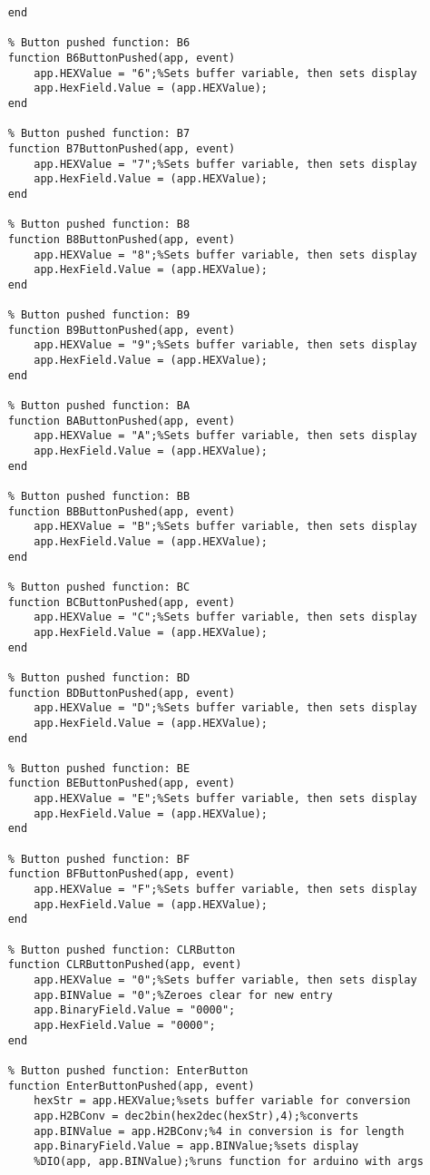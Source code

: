 \documentclass[11pt]{article}
\begin{document}
\begin{verbatim}
	end

	% Button pushed function: B6
	function B6ButtonPushed(app, event)
	    app.HEXValue = "6";%Sets buffer variable, then sets display
	    app.HexField.Value = (app.HEXValue);
	end

	% Button pushed function: B7
	function B7ButtonPushed(app, event)
	    app.HEXValue = "7";%Sets buffer variable, then sets display
	    app.HexField.Value = (app.HEXValue);
	end

	% Button pushed function: B8
	function B8ButtonPushed(app, event)
	    app.HEXValue = "8";%Sets buffer variable, then sets display
	    app.HexField.Value = (app.HEXValue);
	end

	% Button pushed function: B9
	function B9ButtonPushed(app, event)
	    app.HEXValue = "9";%Sets buffer variable, then sets display
	    app.HexField.Value = (app.HEXValue);
	end

	% Button pushed function: BA
	function BAButtonPushed(app, event)
	    app.HEXValue = "A";%Sets buffer variable, then sets display
	    app.HexField.Value = (app.HEXValue);
	end

	% Button pushed function: BB
	function BBButtonPushed(app, event)
	    app.HEXValue = "B";%Sets buffer variable, then sets display
	    app.HexField.Value = (app.HEXValue);
	end

	% Button pushed function: BC
	function BCButtonPushed(app, event)
	    app.HEXValue = "C";%Sets buffer variable, then sets display
	    app.HexField.Value = (app.HEXValue);
	end

	% Button pushed function: BD
	function BDButtonPushed(app, event)
	    app.HEXValue = "D";%Sets buffer variable, then sets display
	    app.HexField.Value = (app.HEXValue);
	end

	% Button pushed function: BE
	function BEButtonPushed(app, event)
	    app.HEXValue = "E";%Sets buffer variable, then sets display
	    app.HexField.Value = (app.HEXValue);
	end

	% Button pushed function: BF
	function BFButtonPushed(app, event)
	    app.HEXValue = "F";%Sets buffer variable, then sets display
	    app.HexField.Value = (app.HEXValue);
	end

	% Button pushed function: CLRButton
	function CLRButtonPushed(app, event)
	    app.HEXValue = "0";%Sets buffer variable, then sets display
	    app.BINValue = "0";%Zeroes clear for new entry
	    app.BinaryField.Value = "0000";
	    app.HexField.Value = "0000";
	end

	% Button pushed function: EnterButton
	function EnterButtonPushed(app, event)
	    hexStr = app.HEXValue;%sets buffer variable for conversion
	    app.H2BConv = dec2bin(hex2dec(hexStr),4);%converts
	    app.BINValue = app.H2BConv;%4 in conversion is for length
	    app.BinaryField.Value = app.BINValue;%sets display 
	    %DIO(app, app.BINValue);%runs function for arduino with args





\end{verbatim}
\end{document}

